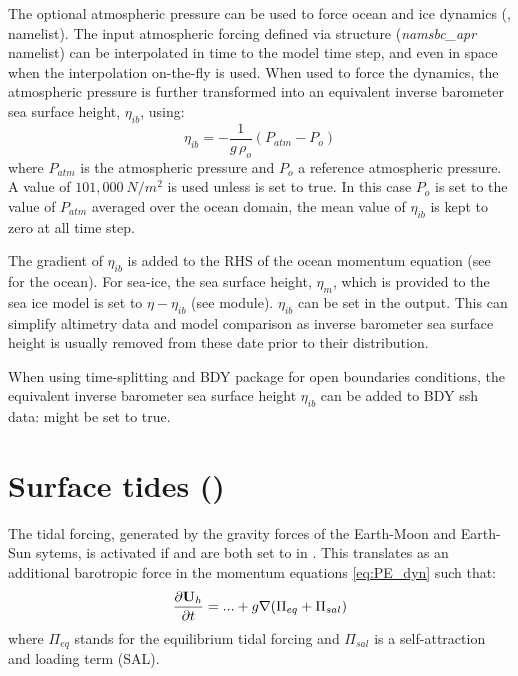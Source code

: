 \documentclass[../main/NEMO_manual]{subfiles}
\begin{document}
The optional atmospheric pressure can be used to force ocean and ice dynamics
(, \textit{} namelist).
The input atmospheric forcing defined via  structure (\textit{namsbc\_apr} namelist)
can be interpolated in time to the model time step, and even in space when the interpolation on-the-fly is used.
When used to force the dynamics, the atmospheric pressure is further transformed into
an equivalent inverse barometer sea surface height, $\eta_{ib}$, using:
\[
  \eta_{ib} = -  \frac{1}{g\,\rho_o}  \left( P_{atm} - P_o \right)
\]
where $P_{atm}$ is the atmospheric pressure and $P_o$ a reference atmospheric pressure.
A value of $101,000~N/m^2$ is used unless  is set to true.
In this case $P_o$ is set to the value of $P_{atm}$ averaged over the ocean domain,
\ie the mean value of $\eta_{ib}$ is kept to zero at all time step.

The gradient of $\eta_{ib}$ is added to the RHS of the ocean momentum equation (see  for the ocean).
For sea-ice, the sea surface height, $\eta_m$, which is provided to the sea ice model is set to $\eta - \eta_{ib}$
(see  module).
$\eta_{ib}$ can be set in the output.
This can simplify altimetry data and model comparison as
inverse barometer sea surface height is usually removed from these date prior to their distribution.

When using time-splitting and BDY package for open boundaries conditions,
the equivalent inverse barometer sea surface height $\eta_{ib}$ can be added to BDY ssh data: 
  might be set to true.

\section{Surface tides (\protect{})}
\label{sec:SBC_tide}



The tidal forcing, generated by the gravity forces of the Earth-Moon and Earth-Sun sytems,
is activated if  and  are both set to  in .
This translates as an additional barotropic force in the momentum equations \ref{eq:PE_dyn} such that:
\[
  \frac{\partial {\rm {\bf U}}_h }{\partial t}= ...
  +g\nabla (\Pi_{eq} + \Pi_{sal})
\]
where $\Pi_{eq}$ stands for the equilibrium tidal forcing and
$\Pi_{sal}$ is a self-attraction and loading term (SAL).
 
\end{document}
